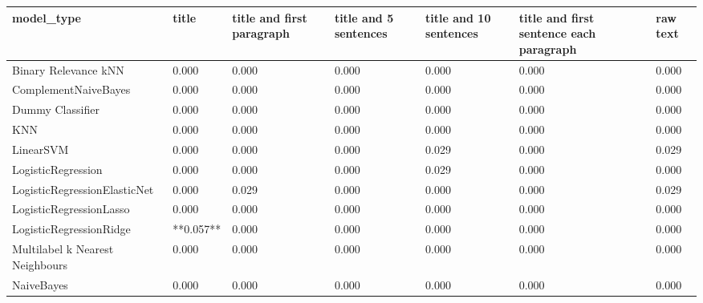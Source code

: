 \begin{tabular}{lllllll}
\toprule
                     model\_type &     title & title and first paragraph & title and 5 sentences & title and 10 sentences & title and first sentence each paragraph & raw text \\
\midrule
           Binary Relevance kNN &     0.000 &                     0.000 &                 0.000 &                  0.000 &                                   0.000 &    0.000 \\
           ComplementNaiveBayes &     0.000 &                     0.000 &                 0.000 &                  0.000 &                                   0.000 &    0.000 \\
               Dummy Classifier &     0.000 &                     0.000 &                 0.000 &                  0.000 &                                   0.000 &    0.000 \\
                            KNN &     0.000 &                     0.000 &                 0.000 &                  0.000 &                                   0.000 &    0.000 \\
                      LinearSVM &     0.000 &                     0.000 &                 0.000 &                  0.029 &                                   0.000 &    0.029 \\
             LogisticRegression &     0.000 &                     0.000 &                 0.000 &                  0.029 &                                   0.000 &    0.000 \\
   LogisticRegressionElasticNet &     0.000 &                     0.029 &                 0.000 &                  0.000 &                                   0.000 &    0.029 \\
        LogisticRegressionLasso &     0.000 &                     0.000 &                 0.000 &                  0.000 &                                   0.000 &    0.000 \\
        LogisticRegressionRidge & **0.057** &                     0.000 &                 0.000 &                  0.000 &                                   0.000 &    0.000 \\
Multilabel k Nearest Neighbours &     0.000 &                     0.000 &                 0.000 &                  0.000 &                                   0.000 &    0.000 \\
                     NaiveBayes &     0.000 &                     0.000 &                 0.000 &                  0.000 &                                   0.000 &    0.000 \\

\end{tabular}

